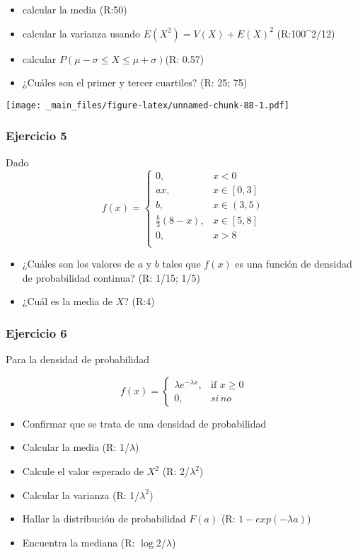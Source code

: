 \documentclass[
]{book}
\providecommand{\tightlist}{%
  \setlength{\itemsep}{0pt}\setlength{\parskip}{0pt}}
\begin{document}
\begin{itemize}
\tightlist
\item
  calcular la media (R:50)
\item
  calcular la varianza usando \(E(X^2)=V(X)+E(X)^2\) (R:100\^{}2/12)
\item
  calcular \(P(\mu-\sigma\leq X \leq \mu+\sigma)\)(R: 0.57)
\item
  ¿Cuáles son el primer y tercer cuartiles? (R: 25; 75)
\end{itemize}

\texttt{[image: \_main\_files/figure-latex/unnamed-chunk-88-1.pdf]}

\hypertarget{ejercicio-5-1}{%
\subsubsection{Ejercicio 5}\label{ejercicio-5-1}}

Dado
\[
    f(x)= 
\begin{cases}
0, & x < 0 \\
ax, & x \in [0,3] \\
b, & x \in (3,5) \\
\frac{b}{3}(8-x),& x \in [5,8]\\
0, & x > 8 \\
\end{cases}
\]

\begin{itemize}
\item
  ¿Cuáles son los valores de \(a\) y \(b\) tales que \(f(x)\) es una función de densidad de probabilidad continua? (R: 1/15; 1/5)
\item
  ¿Cuál es la media de \(X\)? (R:4)
\end{itemize}

\hypertarget{ejercicio-6}{%
\subsubsection{Ejercicio 6}\label{ejercicio-6}}

Para la densidad de probabilidad

\[
    f(x)= 
\begin{cases}
    \lambda e^{-\lambda x},& \text{if } x \geq 0\\
    0,& si\,no 
\end{cases}
\]

\begin{itemize}
\tightlist
\item
  Confirmar que se trata de una densidad de probabilidad
\item
  Calcular la media (R: 1/\(\lambda\))
\item
  Calcule el valor esperado de \(X^2\) (R: 2/\(\lambda^2\))
\item
  Calcular la varianza (R: 1/\(\lambda^2\))
\item
  Hallar la distribución de probabilidad \(F(a)\) (R: \(1-exp(-\lambda a)\))
\item
  Encuentra la mediana (R: \(\log{2}\)/\(\lambda\))
\end{itemize}
\end{document}
